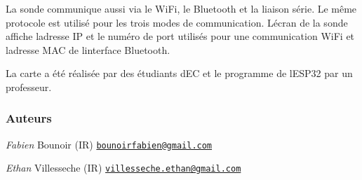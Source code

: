 La sonde communique aussi via le Wi\+Fi, le Bluetooth et la liaison série. Le même protocole est utilisé pour les trois modes de communication. L\textquotesingle{}écran de la sonde affiche l\textquotesingle{}adresse IP et le numéro de port utilisés pour une communication Wi\+Fi et l\textquotesingle{}adresse M\+AC de l\textquotesingle{}interface Bluetooth.

La carte a été réalisée par des étudiants d\textquotesingle{}EC et le programme de l\textquotesingle{}E\+S\+P32 par un professeur.



\subsubsection*{Auteurs}

{\itshape Fabien} Bounoir (IR) \href{mailto:bounoirfabien@gmail.com}{\tt bounoirfabien@gmail.\+com}

{\itshape Ethan} Villesseche (IR) \href{mailto:villesseche.ethan@gmail.com}{\tt villesseche.\+ethan@gmail.\+com} 